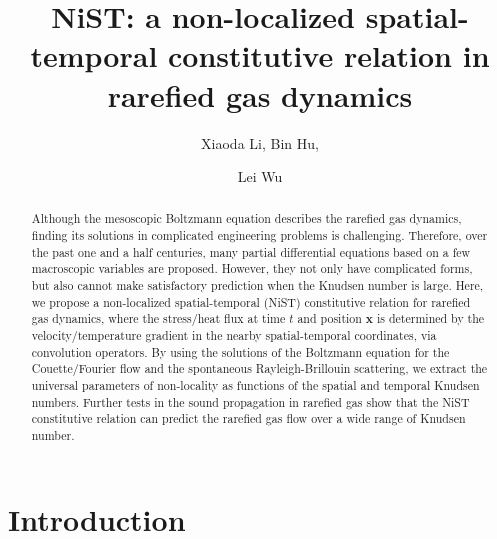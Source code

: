 \documentclass[lineno]{jfm}
\title{NiST: a non-localized spatial-temporal constitutive relation in rarefied gas dynamics}
\author{Xiaoda Li, Bin Hu, \and Lei Wu
	\corresp{\email{wul@sustech.edu.cn}}
}
\affiliation{Department of Mechanics and Aerospace Engineering, Southern University of Science and Technology, Shenzhen 518055, China }
\begin{document}
	\maketitle
	
\begin{abstract}
Although the mesoscopic Boltzmann equation describes the rarefied gas dynamics, finding its solutions in complicated engineering problems is challenging. Therefore, over the past one and a half centuries, many partial differential equations based on a few  macroscopic variables are proposed. However, they not only have complicated forms, but also cannot make satisfactory prediction when the Knudsen number is large. Here, we propose a non-localized spatial-temporal (NiST) constitutive relation for rarefied gas dynamics, where the stress/heat flux at time $t$ and position $\bm x$ is determined by the velocity/temperature gradient in the nearby spatial-temporal coordinates, via convolution operators. By using the solutions of the Boltzmann equation for the Couette/Fourier flow and the spontaneous Rayleigh-Brillouin scattering, we extract the universal parameters of non-locality as functions of the spatial and temporal Knudsen numbers. Further tests in the sound propagation in rarefied gas show that the NiST constitutive relation can predict the rarefied gas flow over a wide range of Knudsen number.
\end{abstract}
		
\section{Introduction} \label{sec:introduction}
 
\end{document}
